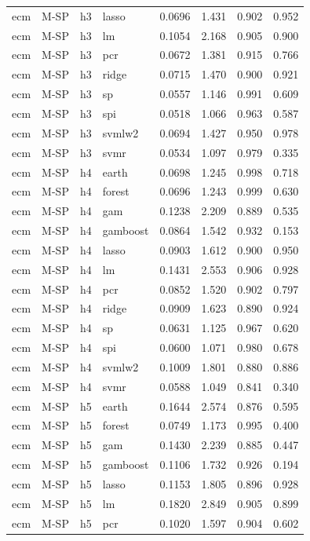 \begin{ThreePartTable}
\begin{longtable}[t]{llclcccc}
ecm & M-SP & h3 & lasso & 0.0696 & 1.431 & 0.902 & 0.952\\
ecm & M-SP & h3 & lm & 0.1054 & 2.168 & 0.905 & 0.900\\
ecm & M-SP & h3 & pcr & 0.0672 & 1.381 & 0.915 & 0.766\\
ecm & M-SP & h3 & ridge & 0.0715 & 1.470 & 0.900 & 0.921\\
ecm & M-SP & h3 & sp & 0.0557 & 1.146 & 0.991 & 0.609\\
ecm & M-SP & h3 & spi & 0.0518 & 1.066 & 0.963 & 0.587\\
ecm & M-SP & h3 & svmlw2 & 0.0694 & 1.427 & 0.950 & 0.978\\
ecm & M-SP & h3 & svmr & 0.0534 & 1.097 & 0.979 & 0.335\\
\addlinespace
ecm & M-SP & h4 & earth & 0.0698 & 1.245 & 0.998 & 0.718\\
ecm & M-SP & h4 & forest & 0.0696 & 1.243 & 0.999 & 0.630\\
ecm & M-SP & h4 & gam & 0.1238 & 2.209 & 0.889 & 0.535\\
ecm & M-SP & h4 & gamboost & 0.0864 & 1.542 & 0.932 & 0.153\\
ecm & M-SP & h4 & lasso & 0.0903 & 1.612 & 0.900 & 0.950\\
ecm & M-SP & h4 & lm & 0.1431 & 2.553 & 0.906 & 0.928\\
ecm & M-SP & h4 & pcr & 0.0852 & 1.520 & 0.902 & 0.797\\
ecm & M-SP & h4 & ridge & 0.0909 & 1.623 & 0.890 & 0.924\\
ecm & M-SP & h4 & sp & 0.0631 & 1.125 & 0.967 & 0.620\\
ecm & M-SP & h4 & spi & 0.0600 & 1.071 & 0.980 & 0.678\\
ecm & M-SP & h4 & svmlw2 & 0.1009 & 1.801 & 0.880 & 0.886\\
ecm & M-SP & h4 & svmr & 0.0588 & 1.049 & 0.841 & 0.340\\
\addlinespace
ecm & M-SP & h5 & earth & 0.1644 & 2.574 & 0.876 & 0.595\\
ecm & M-SP & h5 & forest & 0.0749 & 1.173 & 0.995 & 0.400\\
ecm & M-SP & h5 & gam & 0.1430 & 2.239 & 0.885 & 0.447\\
ecm & M-SP & h5 & gamboost & 0.1106 & 1.732 & 0.926 & 0.194\\
ecm & M-SP & h5 & lasso & 0.1153 & 1.805 & 0.896 & 0.928\\
ecm & M-SP & h5 & lm & 0.1820 & 2.849 & 0.905 & 0.899\\
ecm & M-SP & h5 & pcr & 0.1020 & 1.597 & 0.904 & 0.602\\

\end{longtable}
\end{ThreePartTable}
